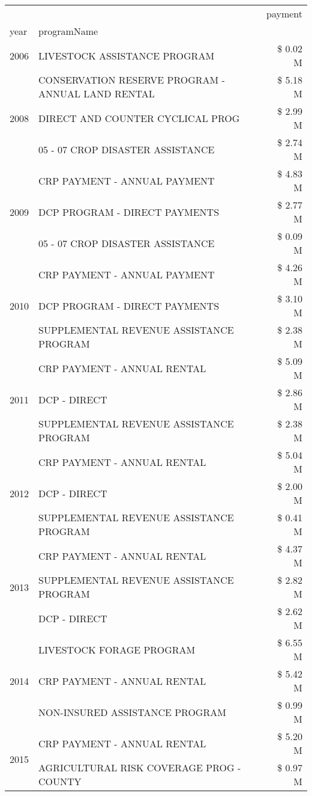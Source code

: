 \begin{tabular}{llr}
\toprule
 &  & payment \\
year & programName &  \\
\midrule
2006 & LIVESTOCK ASSISTANCE PROGRAM & \$ 0.02 M \\
\cline{1-3}
\multirow[t]{3}{*}{2008} & CONSERVATION RESERVE PROGRAM - ANNUAL LAND RENTAL & \$ 5.18 M \\
 & DIRECT AND COUNTER CYCLICAL PROG & \$ 2.99 M \\
 & 05 - 07 CROP DISASTER ASSISTANCE & \$ 2.74 M \\
\cline{1-3}
\multirow[t]{3}{*}{2009} & CRP PAYMENT - ANNUAL PAYMENT & \$ 4.83 M \\
 & DCP PROGRAM - DIRECT PAYMENTS & \$ 2.77 M \\
 & 05 - 07 CROP DISASTER ASSISTANCE & \$ 0.09 M \\
\cline{1-3}
\multirow[t]{3}{*}{2010} & CRP PAYMENT - ANNUAL PAYMENT & \$ 4.26 M \\
 & DCP PROGRAM - DIRECT PAYMENTS & \$ 3.10 M \\
 & SUPPLEMENTAL REVENUE ASSISTANCE PROGRAM & \$ 2.38 M \\
\cline{1-3}
\multirow[t]{3}{*}{2011} & CRP PAYMENT - ANNUAL RENTAL & \$ 5.09 M \\
 & DCP - DIRECT & \$ 2.86 M \\
 & SUPPLEMENTAL REVENUE ASSISTANCE PROGRAM & \$ 2.38 M \\
\cline{1-3}
\multirow[t]{3}{*}{2012} & CRP PAYMENT - ANNUAL RENTAL & \$ 5.04 M \\
 & DCP - DIRECT & \$ 2.00 M \\
 & SUPPLEMENTAL REVENUE ASSISTANCE PROGRAM & \$ 0.41 M \\
\cline{1-3}
\multirow[t]{3}{*}{2013} & CRP PAYMENT - ANNUAL RENTAL & \$ 4.37 M \\
 & SUPPLEMENTAL REVENUE ASSISTANCE PROGRAM & \$ 2.82 M \\
 & DCP - DIRECT & \$ 2.62 M \\
\cline{1-3}
\multirow[t]{3}{*}{2014} & LIVESTOCK FORAGE PROGRAM & \$ 6.55 M \\
 & CRP PAYMENT - ANNUAL RENTAL & \$ 5.42 M \\
 & NON-INSURED ASSISTANCE PROGRAM & \$ 0.99 M \\
\cline{1-3}
\multirow[t]{3}{*}{2015} & CRP PAYMENT - ANNUAL RENTAL & \$ 5.20 M \\
 & AGRICULTURAL RISK COVERAGE PROG - COUNTY & \$ 0.97 M \\

\end{tabular}
